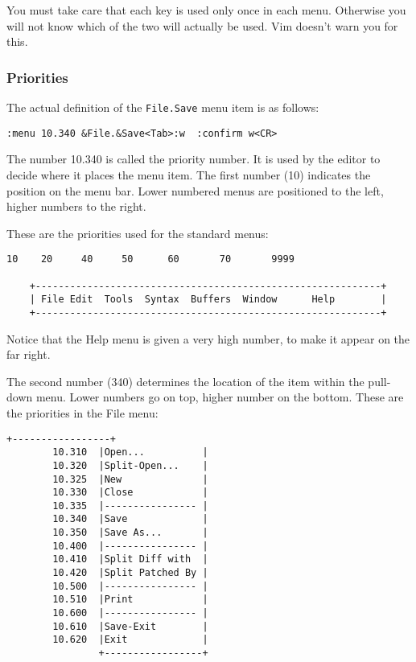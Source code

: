 You must take care that each key is used only once in each menu.
Otherwise you will not know which of the two will actually be used.
Vim doesn't warn you for this.

\subsubsection{Priorities}
The actual definition of the \texttt{File.Save} menu item is as follows:

\begin{Verbatim}[samepage=true]
 :menu 10.340 &File.&Save<Tab>:w  :confirm w<CR>
\end{Verbatim}

The number 10.340 is called the priority number.
It is used by the editor to decide where it places the menu item.
The first number (10) indicates the position on the menu bar.
Lower numbered menus are positioned to the left, higher numbers to the right.

These are the priorities used for the standard menus:

\begin{Verbatim}[samepage=true]
      10    20     40     50      60       70       9999

    +------------------------------------------------------------+
    | File Edit  Tools  Syntax  Buffers  Window      Help        |
    +------------------------------------------------------------+
\end{Verbatim}

Notice that the Help menu is given a very high number, to make it appear on the far right.

The second number (340) determines the location of the item within the pull-down menu.
Lower numbers go on top, higher number on the bottom.
These are the priorities in the File menu:

\begin{Verbatim}[samepage=true]
                +-----------------+
        10.310  |Open...          |
        10.320  |Split-Open...    |
        10.325  |New              |
        10.330  |Close            |
        10.335  |---------------- |
        10.340  |Save             |
        10.350  |Save As...       |
        10.400  |---------------- |
        10.410  |Split Diff with  |
        10.420  |Split Patched By |
        10.500  |---------------- |
        10.510  |Print            |
        10.600  |---------------- |
        10.610  |Save-Exit        |
        10.620  |Exit             |
                +-----------------+
\end{Verbatim}

